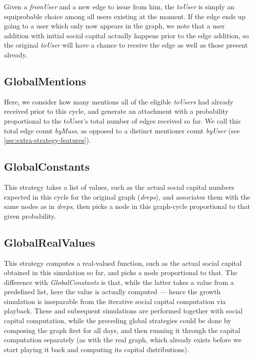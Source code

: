 \documentclass[10pt,oneside]{memoir}
\begin{document}
Given a {\itshape fromUser} and a new edge to issue from him, the {\itshape toUser} is simply an equiprobable choice among all users existing at the moment.  If the edge ends up going to a user which only now appears in the graph, we note that a user addition with initial social capital actually happens prior to the edge addition, so the original {\itshape toUser} will have a chance to receive the edge as well as those present already.


\subsection{GlobalMentions}
\label{globalmentions}

Here, we consider how many mentions all of the eligible {\itshape toUsers} had already received prior to this cycle, and generate an attachment with a probability proportional to the toUser's total number of edges received so far. We call this total edge count {\itshape byMass}, as opposed to a distinct mentioner count {\itshape byUser} (see \ref {sec:extra-strategy-features}).


\subsection{GlobalConstants}
\label{globalconstants}

This strategy takes a list of values, such as the actual social capital numbers expected in this cycle for the original graph ({\itshape dreps}), and associates them with the same nodes as in {\itshape dreps}, then picks a node in this graph-cycle proportional to that given probability.


\subsection{GlobalRealValues}
\label{globalrealvalues}

This strategy computes a real-valued function, such as the actual social capital obtained in this simulation so far, and picks a node proportional to that.  The difference with {\itshape GlobalConstants} is that, while the latter takes a value from a predefined list, here the value is actually computed --- hence the growth simulation is inseparable from the iterative social capital computation via playback.  These and subsequent simulations are performed together with social capital computation, while the preceding global strategies could be done by composing the graph first for all days, and then running it through the capital computation separately (as with the real graph, which already exists before we start playing it back and computing its capital distributions).
\end{document}
